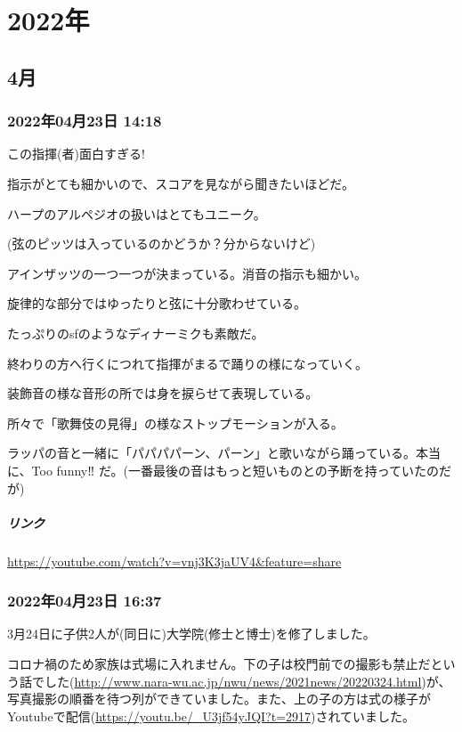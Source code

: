 \chapter{2022年}

\section{4月}

\subsection*{2022年04月23日 14:18}

この指揮(者)面白すぎる!

指示がとても細かいので、スコアを見ながら聞きたいほどだ。

ハープのアルペジオの扱いはとてもユニーク。

(弦のピッツは入っているのかどうか？分からないけど)

アインザッツの一つ一つが決まっている。消音の指示も細かい。

旋律的な部分ではゆったりと弦に十分歌わせている。

たっぷりのsfのようなディナーミクも素敵だ。

終わりの方へ行くにつれて指揮がまるで踊りの様になっていく。

装飾音の様な音形の所では身を捩らせて表現している。

所々で「歌舞伎の見得」の様なストップモーションが入る。

ラッパの音と一緒に「パパパパーン、パーン」と歌いながら踊っている。本当に、Too funny‼︎ だ。(一番最後の音はもっと短いものとの予断を持っていたのだが)

\paragraph{リンク}
\url{https://youtube.com/watch?v=vnj3K3jaUV4&feature=share}

\subsection*{2022年04月23日 16:37}

3月24日に子供2人が(同日に)大学院(修士と博士)を修了しました。

コロナ禍のため家族は式場に入れません。下の子は校門前での撮影も禁止だという話でした(\url{http://www.nara-wu.ac.jp/nwu/news/2021news/20220324.html})が、写真撮影の順番を待つ列ができていました。また、上の子の方は式の様子がYoutubeで配信(\url{https://youtu.be/_U3jf54yJQI?t=2917})されていました。

